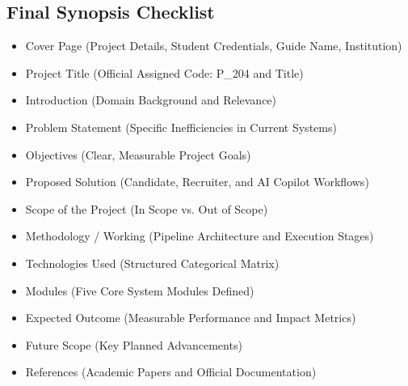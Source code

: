 \documentclass[12pt, a4paper]{article}
\begin{document}
\vspace{0.4cm}

\subsection*{Final Synopsis Checklist}
\begin{itemize}[label=$\square$, leftmargin=2em, itemsep=2pt]
    \item Cover Page (Project Details, Student Credentials, Guide Name, Institution)
    \item Project Title (Official Assigned Code: P\_204 and Title)
    \item Introduction (Domain Background and Relevance)
    \item Problem Statement (Specific Inefficiencies in Current Systems)
    \item Objectives (Clear, Measurable Project Goals)
    \item Proposed Solution (Candidate, Recruiter, and AI Copilot Workflows)
    \item Scope of the Project (In Scope vs. Out of Scope)
    \item Methodology / Working (Pipeline Architecture and Execution Stages)
    \item Technologies Used (Structured Categorical Matrix)
    \item Modules (Five Core System Modules Defined)
    \item Expected Outcome (Measurable Performance and Impact Metrics)
    \item Future Scope (Key Planned Advancements)
    \item References (Academic Papers and Official Documentation)
\end{itemize}
\end{document}
